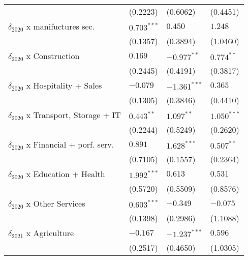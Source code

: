 \begin{tabular}{llll}
                                                   &           (0.2223) &           (0.6062) &           (0.4451) \\
$\delta_{2020}$ x manifuctures sec.                &      $0.703^{***}$ &            $0.450$ &            $1.248$ \\
                                                   &           (0.1357) &           (0.3894) &           (1.0460) \\
$\delta_{2020}$ x Construction                     &            $0.169$ &      $-0.977^{**}$ &       $0.774^{**}$ \\
                                                   &           (0.2445) &           (0.4191) &           (0.3817) \\
$\delta_{2020}$ x Hospitality + Sales              &           $-0.079$ &     $-1.361^{***}$ &            $0.365$ \\
                                                   &           (0.1305) &           (0.3846) &           (0.4410) \\
$\delta_{2020}$ x Transport, Storage + IT          &       $0.443^{**}$ &       $1.097^{**}$ &      $1.050^{***}$ \\
                                                   &           (0.2244) &           (0.5249) &           (0.2620) \\
$\delta_{2020}$ x Financial + porf. serv.          &            $0.891$ &      $1.628^{***}$ &       $0.507^{**}$ \\
                                                   &           (0.7105) &           (0.1557) &           (0.2364) \\
$\delta_{2020}$ x Education + Health               &      $1.992^{***}$ &            $0.613$ &            $0.531$ \\
                                                   &           (0.5720) &           (0.5509) &           (0.8576) \\
$\delta_{2020}$ x Other Services                   &      $0.603^{***}$ &           $-0.349$ &           $-0.075$ \\
                                                   &           (0.1398) &           (0.2986) &           (1.1088) \\
$\delta_{2021}$ x Agriculture                      &           $-0.167$ &     $-1.237^{***}$ &            $0.596$ \\
                                                   &           (0.2517) &           (0.4650) &           (1.0305) \\

\end{tabular}
